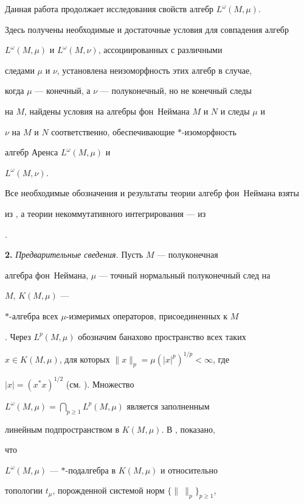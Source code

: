 Данная работа продолжает исследования свойств алгебр $L^\omega(M,\mu)$. 


Здесь получены необходимые и достаточные условия для совпадения алгебр 


$L^\omega(M,\mu)$ и $L^\omega(M,\nu)$, ассоциированных с различными 


следами $\mu$ и $\nu$, установлена неизоморфность этих алгебр в случае, 


когда $\mu$ --- конечный, а $\nu$ --- полуконечный, но не конечный следы 


на $M$, найдены условия на алгебры фон~Неймана $M$ и $N$ и следы $\mu$ и 


$\nu$ на $M$ и $N$ соответственно, обеспечивающие $*$-изоморфность 


алгебр Аренса $L^\omega(M,\mu)$ и 


$L^\omega(M,\nu)$. 


 


Все необходимые обозначения и результаты теории алгебр фон~Неймана взяты 


из \cite{6}, а теории некоммутативного интегрирования --- из 


\cite{7}. 


\medskip 


 


{\bf 2.} {\it Предварительные сведения.} Пусть $M$ --- полуконечная 


алгебра фон~Неймана, $\mu$ --- точный нормальный полуконечный след на 


$M$, $K(M,\mu)$ --- 


$*$-алгебра всех $\mu$-измеримых операторов, присоединенных к $M$ 


\cite{7}. Через $L^p(M,\mu)$ обозначим банахово пространство всех таких 


$x\in K(M,\mu)$, для которых $\|x\|_p=\mu(|x|^p)^{1/p}<\infty$, где 


$|x|=(x^*x)^{1/2}$ (см. \cite{8}). Множество 


$L^\omega(M,\mu)=\bigcap\limits_{p\ge 1}L^p(M,\mu)$ является заполненным 


линейным подпространством в $K(M,\mu)$. В \cite{1}, \cite{2} показано, 


что 


$L^\omega(M,\mu)$ --- $*$-подалгебра в $K(M,\mu)$ и относительно 


топологии $t_\mu$, порожденной системой норм $\{\|\ \|_p\}_{p\ge 1}$, 


